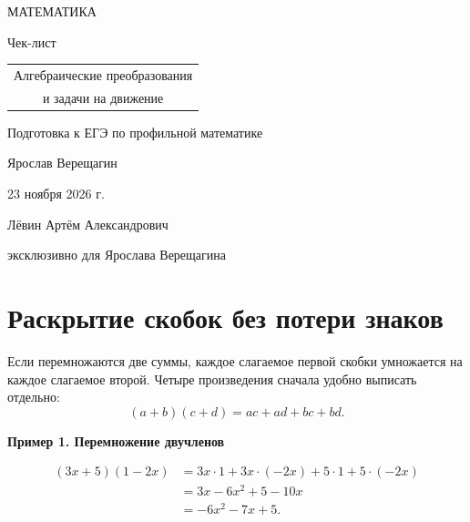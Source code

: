 \documentclass[a4paper,12pt]{article}
\newcommand{\method}[1]{\par\medskip\textcolor{darkaccent}{\textbf{#1}}\par\smallskip}
\newcommand{\important}[1]{\textcolor{darkaccent}{#1}}
\begin{document}
\thispagestyle{empty}
\begin{center}
\vspace*{18mm}
{\large\color{darkaccent} МАТЕМАТИКА\par}
\vspace{16mm}
{\LARGE Чек-лист\par}
\vspace{13mm}
{\LARGE\color{accent}\begin{tabular}{c}
Алгебраические преобразования\\[3mm]
и задачи на движение
\end{tabular}\par}
\vspace{13mm}
{\normalsize Подготовка к ЕГЭ по профильной математике\par}
\vspace{24mm}
{\normalsize Ярослав Верещагин\par}
\vspace{11mm}
{\normalsize 23 ноября 2026 г.\par}
\vfill
{\footnotesize Лёвин Артём Александрович\par}
{\footnotesize эксклюзивно для Ярослава Верещагина\par}
\vspace{10mm}
\end{center}
\clearpage
\setcounter{page}{1}

\section{Раскрытие скобок без потери знаков}

Если перемножаются две суммы, \important{каждое слагаемое первой скобки} умножается на \important{каждое слагаемое второй}. Четыре произведения сначала удобно выписать отдельно:
\[
(a+b)(c+d)=ac+ad+bc+bd.
\]

\method{Пример 1. Перемножение двучленов}
\begin{align*}
(3x+5)(1-2x)
 &=3x\cdot1+3x\cdot(-2x)+5\cdot1+5\cdot(-2x)\\
 &=3x-6x^2+5-10x\\
 &=-6x^2-7x+5.
\end{align*}
\end{document}
